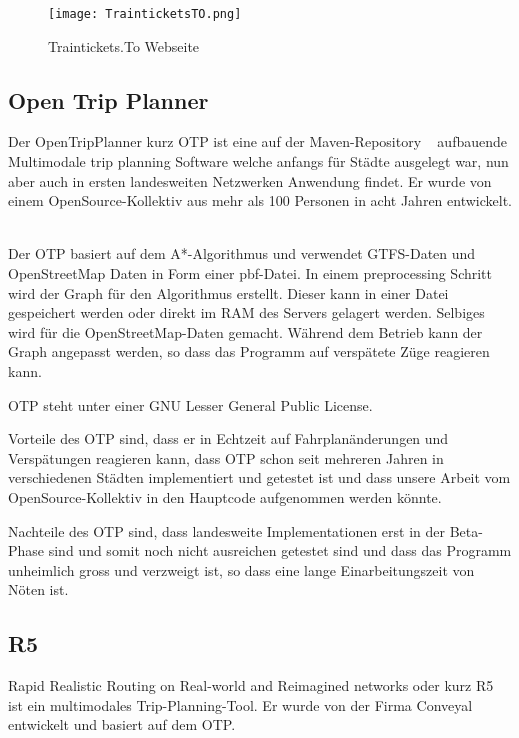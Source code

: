 \begin{figure}[]
	\centering
	\texttt{[image: TrainticketsTO.png]}
	\caption{Traintickets.To Webseite ~\cite{traintickets_site}}
	\label{fig:TrainticketsTO}
\end{figure}     


\subsection{Open Trip Planner}
\label{sec:OTP}

Der OpenTripPlanner kurz OTP ist eine auf der Maven-Repository ~\cite{maven_repository} aufbauende Multimodale trip planning Software welche anfangs für Städte ausgelegt war, nun aber auch in ersten landesweiten Netzwerken Anwendung findet. Er wurde von einem OpenSource-Kollektiv aus mehr als 100 Personen in acht Jahren entwickelt. ~\cite{otp_website}

Der OTP basiert auf dem A*-Algorithmus und verwendet GTFS-Daten und OpenStreetMap Daten in Form einer pbf-Datei. In einem preprocessing Schritt wird der Graph für den Algorithmus erstellt. Dieser kann in einer Datei gespeichert werden oder direkt im RAM des Servers gelagert werden. Selbiges wird für die OpenStreetMap-Daten gemacht. Während dem Betrieb kann der Graph angepasst werden, so dass das Programm auf verspätete Züge reagieren kann. ~\cite{otp_git}

OTP steht unter einer GNU Lesser General Public License. 

Vorteile des OTP sind, dass er in Echtzeit auf Fahrplanänderungen und Verspätungen reagieren kann, dass OTP schon seit mehreren Jahren in verschiedenen Städten implementiert und getestet ist und dass unsere Arbeit vom OpenSource-Kollektiv in den Hauptcode aufgenommen werden könnte. 

Nachteile des OTP sind, dass landesweite Implementationen erst in der Beta-Phase sind und somit noch nicht ausreichen getestet sind und dass das Programm unheimlich gross und verzweigt ist, so dass eine lange Einarbeitungszeit von Nöten ist.



\subsection{R5}
\label{sec:R5}

Rapid Realistic Routing on Real-world and Reimagined networks oder kurz R5 ist ein multimodales Trip-Planning-Tool. Er wurde von der Firma Conveyal ~\cite{conveyal} entwickelt und basiert auf dem OTP. 

